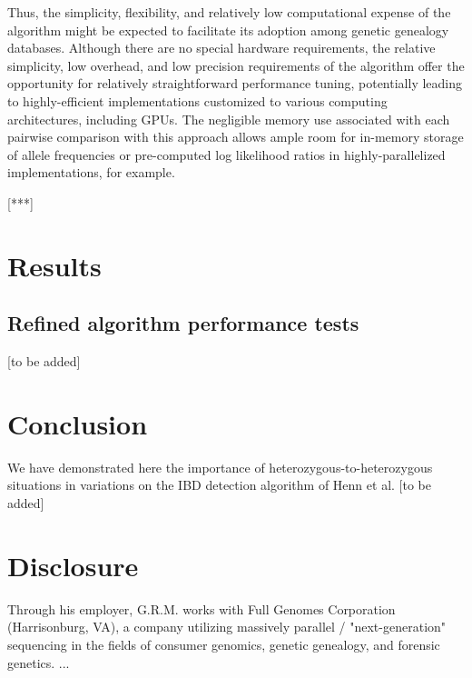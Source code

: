 \documentclass{article}
\begin{document}
Thus, the simplicity, flexibility, and relatively low computational expense of the algorithm might be expected to facilitate its adoption among genetic genealogy databases. Although there are no special hardware requirements, the relative simplicity, low overhead, and low precision requirements of the algorithm offer the opportunity for relatively straightforward performance tuning, potentially leading to highly-efficient implementations customized to various computing architectures, including GPUs. The negligible memory use associated with each pairwise comparison with this approach allows ample room for in-memory storage of allele frequencies or pre-computed log likelihood ratios in highly-parallelized implementations, for example.

[***]

\section{Results}
\subsection{Refined algorithm performance tests}
[to be added]

\section{Conclusion}
We have demonstrated here the importance of heterozygous-to-heterozygous situations in variations on the IBD detection algorithm of Henn et al. [to be added] 

\section{Disclosure}
Through his employer, G.R.M. works with Full Genomes Corporation (Harrisonburg, VA), a company utilizing massively parallel / "next-generation" sequencing in the fields of consumer genomics, genetic genealogy, and forensic genetics.
...



\end{document}

